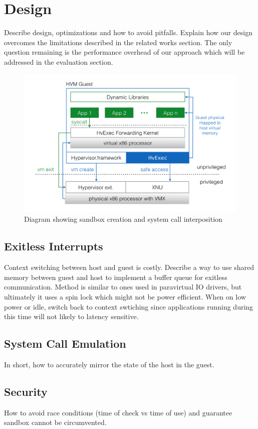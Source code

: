 \documentclass{article}
\begin{document}
\section{Design}
Describe design, optimizations and how to avoid pitfalls.
Explain how our design overcomes the limitations described in the related works section.
The only question remaining is the performance overhead of our approach which will be
addressed in the evaluation section.
\begin{figure}[ht]
    \includegraphics[width=16cm]{hvm}
    \caption{Diagram showing sandbox creation and system call interposition}
    \centering
\end{figure}
\subsection{Exitless Interrupts}
Context switching between host and guest is costly.
Describe a way to use shared memory between guest and host to implement a buffer queue for exitless
communication.
Method is similar to ones used in paravirtual IO drivers, but ultimately it uses a spin lock which might not be
power efficient.
When on low power or idle, switch back to context swtiching since applications running during this time will not likely to latency sensitive.
\subsection{System Call Emulation}
In short, how to accurately mirror the state of the host in the guest.
\subsection{Security}
How to avoid race conditions (time of check vs time of use) and guarantee sandbox cannot be circumvented.
\end{document}
